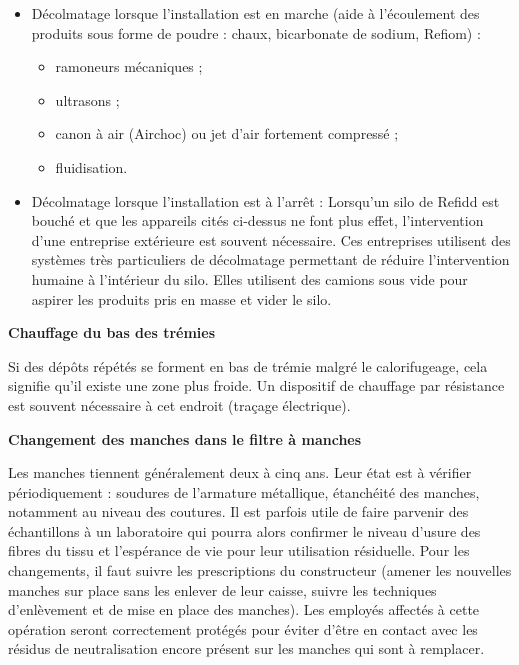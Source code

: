 \begin{itemize}
    \item Décolmatage lorsque l’installation est en marche (aide à l’écoulement des produits sous forme de poudre : chaux, bicarbonate de sodium, Refiom) :
     \begin{itemize}
\item ramoneurs mécaniques ;
\item ultrasons ;
\item canon à air (Airchoc) ou jet d’air fortement compressé ;
\item fluidisation.

    \end{itemize}
    \item Décolmatage lorsque l’installation est à l’arrêt :
Lorsqu’un silo de Refidd est bouché et que les appareils cités ci-dessus ne font plus effet, l’intervention d’une entreprise extérieure est souvent nécessaire. Ces entreprises utilisent des systèmes très particuliers de décolmatage permettant de réduire l’intervention humaine à l’intérieur du silo. Elles utilisent des camions sous vide pour aspirer les produits pris en masse et vider le silo.
\end{itemize}


\vspace{0.3cm}
\textbf{Chauffage du bas des trémies}
\vspace{0.3cm}

Si des dépôts répétés se forment en bas de trémie malgré le calorifugeage, cela signifie qu’il existe une zone plus froide. Un dispositif de chauffage par résistance est souvent nécessaire à cet endroit (traçage électrique).

\vspace{0.3cm}
\textbf{Changement des manches dans le filtre à manches}
\vspace{0.3cm}

Les manches tiennent généralement deux à cinq ans. Leur état est à vérifier périodiquement : soudures de l’armature métallique, étanchéité des manches, notamment au niveau des coutures.
Il est parfois utile de faire parvenir des échantillons à un laboratoire qui pourra alors confirmer le niveau d’usure des fibres du tissu et l’espérance de vie pour leur utilisation résiduelle.
Pour les changements, il faut suivre les prescriptions du constructeur (amener les nouvelles manches sur place sans les enlever de leur caisse, suivre les techniques d’enlèvement et de mise en place des manches).
Les employés affectés à cette opération seront correctement protégés pour éviter d’être en contact avec les résidus de neutralisation encore présent sur les manches qui sont à remplacer.

